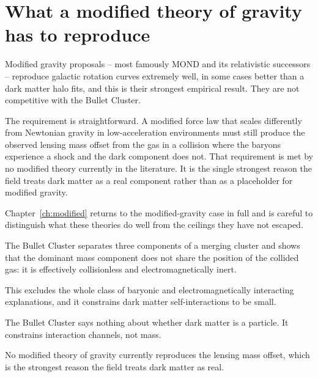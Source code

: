 \section{What a modified theory of gravity has to reproduce}Modified gravity proposals -- most famously
MOND and its relativistic successors -- reproduce galactic rotation curves
extremely well, in some cases better than a dark matter halo fits, and this
is their strongest empirical result. They are not competitive with the
Bullet Cluster.

The requirement is straightforward. A modified force law that scales
differently from Newtonian gravity in low-acceleration environments must
still produce the observed lensing mass offset from the gas in a collision
where the baryons experience a shock and the dark component does not. That
requirement is met by no modified theory currently in the literature. It is
the single strongest reason the field treats dark matter as a real component
rather than as a placeholder for modified gravity.

Chapter~\ref{ch:modified} returns to the modified-gravity case in full and
is careful to distinguish what these theories do well from the ceilings they
have not escaped.

\begin{keytakeaways}
\item The Bullet Cluster separates three components of a merging cluster and
shows that the dominant mass component does not share the position of the
collided gas: it is effectively collisionless and electromagnetically inert.
\item This excludes the whole class of baryonic and electromagnetically
interacting explanations, and it constrains dark matter self-interactions to
be small.
\item The Bullet Cluster says nothing about whether dark matter is a
particle. It constrains interaction channels, not mass.
\item No modified theory of gravity currently reproduces the lensing mass
offset, which is the strongest reason the field treats dark matter as real.
\end{keytakeaways}
